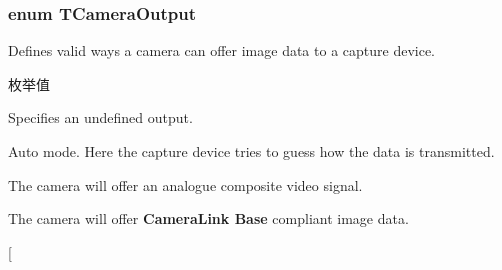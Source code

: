 \hypertarget{group___common_interface_gad85678f02bc0deb0eee9f7ce67644da7}{
\subsubsection[{T\+Camera\+Output}]{\setlength{\rightskip}{0pt plus 5cm}enum {\bf T\+Camera\+Output}}}\label{group___common_interface_gad85678f02bc0deb0eee9f7ce67644da7}


Defines valid ways a camera can offer image data to a capture device. 

\begin{Desc}
\item[枚举值]\par
\begin{description}
\item[{\em 
\hypertarget{group___common_interface_ggad85678f02bc0deb0eee9f7ce67644da7ad52f8e57d2beadcf8be46aef9130745a}{co\+Undefined}\label{group___common_interface_ggad85678f02bc0deb0eee9f7ce67644da7ad52f8e57d2beadcf8be46aef9130745a}
}]Specifies an undefined output. \item[{\em 
\hypertarget{group___common_interface_ggad85678f02bc0deb0eee9f7ce67644da7ad9b031596bf11a8e42573761ad47be27}{co\+Auto}\label{group___common_interface_ggad85678f02bc0deb0eee9f7ce67644da7ad9b031596bf11a8e42573761ad47be27}
}]Auto mode. Here the capture device tries to guess how the data is transmitted. \item[{\em 
\hypertarget{group___common_interface_ggad85678f02bc0deb0eee9f7ce67644da7a612bc664b5c8cf9d20d8452ad7266e15}{co\+Composite}\label{group___common_interface_ggad85678f02bc0deb0eee9f7ce67644da7a612bc664b5c8cf9d20d8452ad7266e15}
}]The camera will offer an analogue composite video signal. \item[{\em 
\hypertarget{group___common_interface_ggad85678f02bc0deb0eee9f7ce67644da7a84455989c1f4643db5baecac246eaff0}{co\+Base}\label{group___common_interface_ggad85678f02bc0deb0eee9f7ce67644da7a84455989c1f4643db5baecac246eaff0}
}]The camera will offer {\bfseries Camera\+Link\textregistered{} Base} compliant image data. \item[{\em 
}
\end{description}
\end{Desc}

